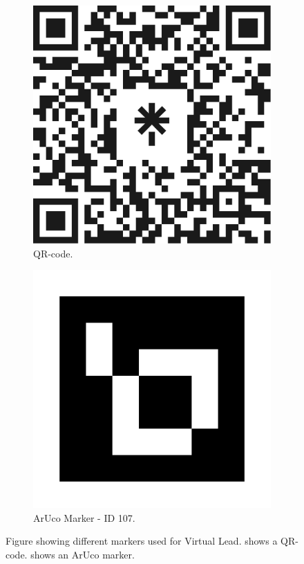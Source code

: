 \documentclass{l4proj}
\begin{document}
\begin{figure}[!ht]
    \centering
    \begin{subfigure}{0.30\textwidth}
        \centering
        \includegraphics[width=\textwidth]{images/qr-code.png}
        \caption{QR-code.}
        \label{fig:qr-code}  
    \end{subfigure}
    \begin{subfigure}{0.32\textwidth}
        \centering
        \includegraphics[width=\textwidth]{images/ARUCO_ID107 - Robot.png}
        \caption{ArUco Marker - ID 107.}
        \label{fig:aruco-marker}  
    \end{subfigure}
    \caption{Figure showing different markers used for Virtual Lead.  shows a QR-code.  shows an ArUco marker.}
    \label{fig:markers}
\end{figure}
\end{document}
